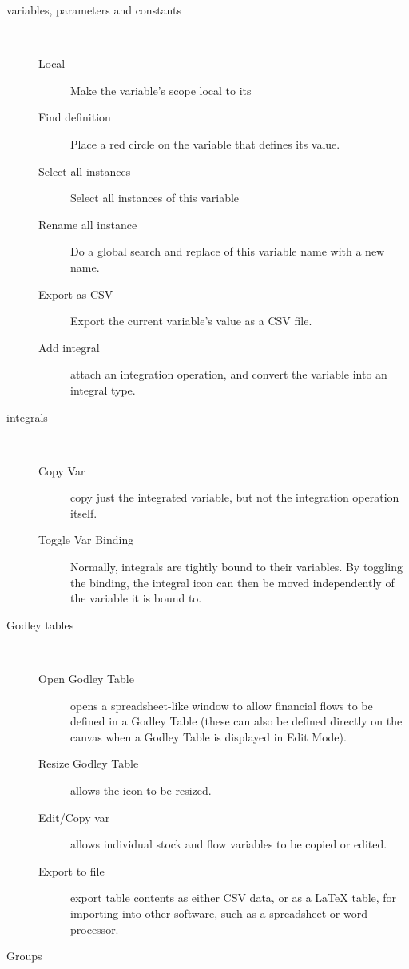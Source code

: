 \begin{description}
\item [{variables, parameters and constants}] %
\mbox{%
%
} 
\begin{description}
\item [{Local}] Make the variable's scope local to its  
\item [{Find definition}] Place a red circle on the variable that defines
its value. 
\item [{Select all instances}] Select all instances of this variable 
\item [{Rename all instance}] Do a global search and replace of this variable
name with a new name. 
\item [{Export as CSV}] Export the current variable's value as a CSV file.
\item [{Add integral}] attach an integration operation, and convert the
variable into an integral type.
\end{description}
\item [{integrals}] %
\mbox{%
%
} 
\begin{description}
\item [{Copy Var}] copy just the integrated variable, but not the integration
operation itself.
\item [{Toggle Var Binding}] Normally, integrals are tightly bound to
their variables. By toggling the binding, the integral icon can then
be moved independently of the variable it is bound to. 
\end{description}
\item [{Godley tables}] %
\mbox{%
%
} 
\begin{description}
\item [{Open Godley Table}] opens a spreadsheet-like window to allow financial
flows to be defined in a Godley Table (these can also be defined directly
on the canvas when a Godley Table is displayed in Edit Mode).
\item [{Resize Godley Table}] allows the icon to be resized. 
\item [{Edit/Copy var}] allows individual stock and flow variables to
be copied or edited. 
\item [{Export to file}] export table contents as either CSV data, or
as a LaTeX table, for importing into other software, such as a spreadsheet
or word processor. 
\end{description}
\item [{Groups}] %
\mbox{%
%
} 
\begin{description}

\end{description}
\end{description}
